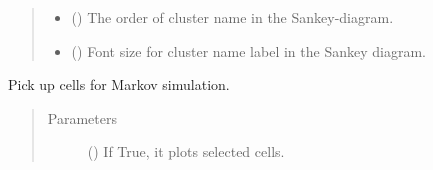 \documentclass[letterpaper,10pt,english]{sphinxmanual}
\begin{document}
\begin{fulllineitems}
\begin{fulllineitems}
\begin{quote}
\begin{description}
\begin{itemize}
\item {} 
 () \textendash{} The order of cluster name in the Sankey-diagram.

\item {} 
 () \textendash{} Font size for cluster name label in the Sankey diagram.

\end{itemize}

\end{description}\end{quote}

\end{fulllineitems}


\begin{fulllineitems}
\label{\detokenize{modules/celloracle:celloracle.Oracle.prepare_markov_simulation}}
Pick up cells for Markov simulation.
\begin{quote}\begin{description}
\item[{Parameters}] \leavevmode
{} () \textendash{} If True, it plots selected cells.

\end{description}\end{quote}

\end{fulllineitems}



\end{fulllineitems}
\end{document}
